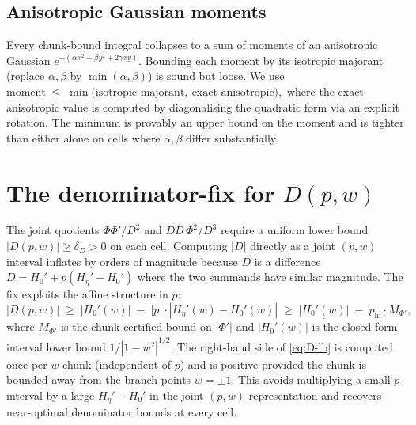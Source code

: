 \documentclass[11pt]{article}
\theoremstyle{definition}
\newcommand{\HzeroP}{H_0'}
\newcommand{\HetaP}{H_{\eta}'}
\newcommand{\abslb}[1]{\underline{|#1|}}
\begin{document}
\subsection{Anisotropic Gaussian moments}\label{sec:aniso}

Every chunk-bound integral collapses to a sum of moments of an anisotropic Gaussian
$e^{-(\alpha x^2 + \beta y^2 + 2\gamma xy)}$. Bounding each moment by its isotropic
majorant (replace $\alpha,\beta$ by $\min(\alpha,\beta)$) is sound but loose. We use
\(
   \text{moment}
   \;\le\;
   \min\bigl(\text{isotropic-majorant},\ \text{exact-anisotropic}\bigr),
\)
where the exact-anisotropic value is computed by diagonalising the quadratic form via
an explicit rotation. The minimum is provably an upper bound on the moment and is
tighter than either alone on cells where $\alpha,\beta$ differ substantially.

\bigskip

\section{The denominator-fix for $D(p,w)$}\label{sec:denom-fix}

The joint quotients $\Phi\Phi'/D^2$ and $DD\,\Phi^2/D^3$ require a uniform lower
bound $|D(p,w)|\ge \delta_D > 0$ on each cell. Computing $|D|$ directly as a joint
$(p,w)$ interval inflates by orders of magnitude because $D$ is a difference
$D = \HzeroP + p(\HetaP-\HzeroP)$ where the two summands have similar magnitude.
The fix exploits the affine structure in $p$:
\begin{equation}\label{eq:D-lb}
   |D(p,w)|
   \;\ge\;
   |\HzeroP(w)|
   \;-\;
   |p|\cdot|\HetaP(w) - \HzeroP(w)|
   \;\ge\;
   \abslb{\HzeroP(w)}\;-\;p_{\mathrm{hi}}\cdot M_{\Phi'},
\end{equation}
where $M_{\Phi'}$ is the chunk-certified bound on $|\Phi'|$ and $\abslb{\HzeroP(w)}$ is
the closed-form interval lower bound $1/|1-w^2|^{1/2}$. The right-hand side of
\eqref{eq:D-lb} is computed once per $w$-chunk (independent of $p$) and is positive
provided the chunk is bounded away from the branch points $w=\pm 1$. This avoids
multiplying a small $p$-interval by a large $\HetaP-\HzeroP$ in the joint $(p,w)$
representation and recovers near-optimal denominator bounds at every cell.

\bigskip

\end{document}
